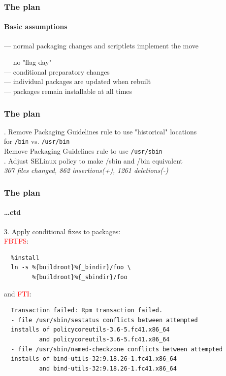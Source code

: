 \documentclass[]{beamer}
\begin{document}
\begin{frame}
  \frametitle{The plan}
  \framesubtitle{Basic assumptions}

  \pause
  — normal packaging changes and scriptlets implement the move
  \\\pause

  — no "flag day"
  \\\pause
  \phantom{—} — conditional preparatory changes%
  \\\pause
  \phantom{—} — individual packages are updated when rebuilt
  \\\pause
  \phantom{—} — packages remain installable at all times
\end{frame}

\begin{frame}[fragile]
  \frametitle{The plan}

  . Remove Packaging Guidelines rule to use "historical" locations\\
     \hspace*{5em} for \texttt{/bin} vs. \texttt{/usr/bin}\\
     Remove Packaging Guidelines rule to use \texttt{/usr/sbin}
  \\

  . Adjust SELinux policy to make /sbin and /bin equivalent\\
  \textit{307 files changed, 862 insertions(+), 1261 deletions(-)}

  \hfill
\end{frame}

\begin{frame}[fragile]
  \frametitle{The plan}
  \framesubtitle{…ctd}

  3. Apply conditional fixes to packages:\\
  \textcolor{red}{FBTFS}:{\small
  \begin{verbatim}
  %install
  ln -s %{buildroot}%{_bindir}/foo \
        %{buildroot}%{_sbindir}/foo
  \end{verbatim}
  }
  and \textcolor{red}{FTI}:{\small
  \begin{verbatim}
  Transaction failed: Rpm transaction failed.
  - file /usr/sbin/sestatus conflicts between attempted
  installs of policycoreutils-3.6-5.fc41.x86_64
          and policycoreutils-3.6-5.fc41.x86_64
  - file /usr/sbin/named-checkzone conflicts between attempted
  installs of bind-utils-32:9.18.26-1.fc41.x86_64
          and bind-utils-32:9.18.26-1.fc41.x86_64
  \end{verbatim}
  }

  \hfill
\end{frame}
\end{document}
